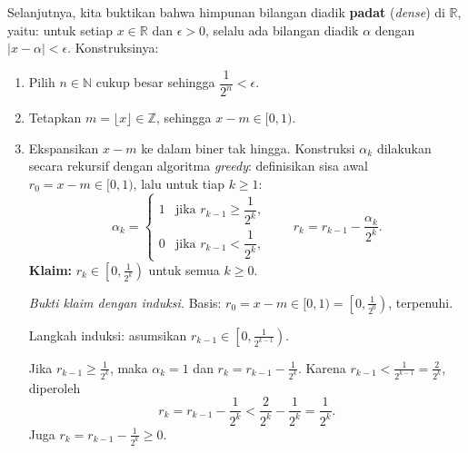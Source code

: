 \documentclass[aspectratio=169,11pt]{beamer}
\theoremstyle{definition}
\newcommand{\R}{\mathbb{R}}
\newcommand{\N}{\mathbb{N}}
\newcommand{\Z}{\mathbb{Z}}
\begin{document}
\begin{frame}[allowframebreaks]{\insertsection}{\insertsubsection}
\begin{itemize}
\begin{enumerate}
                  Selanjutnya, kita buktikan bahwa himpunan bilangan diadik \textbf{padat} (\textit{dense}) di $\R$, yaitu: untuk setiap $x \in \R$ dan $\epsilon > 0$, selalu ada bilangan diadik $\alpha$ dengan $|x - \alpha| < \epsilon$. Konstruksinya:
                  \begin{enumerate}
                    \item Pilih $n \in \N$ cukup besar sehingga $\dfrac{1}{2^n} < \epsilon$.
                    \item Tetapkan $m = \lfloor x \rfloor \in \Z$, sehingga $x - m \in [0,1)$.
                    \item Ekspansikan $x - m$ ke dalam biner tak hingga. Konstruksi $\alpha_k$ dilakukan secara rekursif dengan algoritma \textit{greedy}: definisikan sisa awal $r_0 = x - m \in [0,1)$, lalu untuk tiap $k \geq 1$:
                          \begin{equation*}
                            \alpha_k = \begin{cases} 1 & \text{jika } r_{k-1} \geq \dfrac{1}{2^k}, \\ 0 & \text{jika } r_{k-1} < \dfrac{1}{2^k}, \end{cases} \qquad r_k = r_{k-1} - \frac{\alpha_k}{2^k}.
                          \end{equation*}
                          \textbf{Klaim:} $r_k \in \left[0, \frac{1}{2^k}\right)$ untuk semua $k \geq 0$.

                          \textit{Bukti klaim dengan induksi.} Basis: $r_0 = x - m \in [0,1) = \left[0, \frac{1}{2^0}\right)$, terpenuhi.

                          Langkah induksi: asumsikan $r_{k-1} \in \left[0, \frac{1}{2^{k-1}}\right)$.

                          Jika $r_{k-1} \geq \frac{1}{2^k}$, maka $\alpha_k = 1$ dan $r_k = r_{k-1} - \frac{1}{2^k}$. Karena $r_{k-1} < \frac{1}{2^{k-1}} = \frac{2}{2^k}$, diperoleh
                          \[r_k = r_{k-1} - \frac{1}{2^k} < \frac{2}{2^k} - \frac{1}{2^k} = \frac{1}{2^k}.\]
                          Juga $r_k = r_{k-1} - \frac{1}{2^k} \geq 0$.


\end{enumerate}
\end{enumerate}
\end{itemize}
\end{frame}
\end{document}
